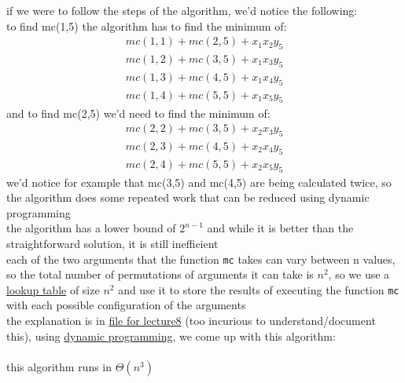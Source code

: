 \documentclass[a4paper,12pt]{article}
\begin{document}
if we were to follow the steps of the algorithm, we'd notice the following:\\[0pt]
to find mc(1,5) the algorithm has to find the minimum of:\\[0pt]
\begin{gather*}
  mc(1,1) + mc(2,5) + x_1x_2y_5\\
  mc(1,2) + mc(3,5) + x_1x_3y_5\\
  mc(1,3) + mc(4,5) + x_1x_4y_5\\
  mc(1,4) + mc(5,5) + x_1x_5y_5
\end{gather*}
and to find mc(2,5) we'd need to find the minimum of:\\[0pt]
\begin{gather*}
  mc(2,2) + mc(3,5) + x_2x_3y_5\\
  mc(2,3) + mc(4,5) + x_2x_4y_5\\
  mc(2,4) + mc(5,5) + x_2x_5y_5
\end{gather*}
we'd notice for example that mc(3,5) and mc(4,5) are being calculated twice, so the algorithm does some repeated work that can be reduced using dynamic programming\\[0pt]
the algorithm has a lower bound of \(2^{n-1}\) and while it is better than the straightforward solution, it is still inefficient\\[0pt]
each of the two arguments that the function \texttt{mc} takes can vary between n values, so the total number of permutations of arguments it can take is \(n^2\), so we use a \href{20230208201152-array_as_map.org}{lookup table} of size \(n^2\) and use it to store the results of executing the function \texttt{mc} with each possible configuration of the arguments\\[0pt]
the explanation is in \href{file:///Volumes/brainpartition/brain/notes/data/C6/4FF75D-6235-43D2-9CB5-601918A73D95/הרצאה 8 אלגוריתמים א חוברת.pdf}{file for lecture8} (too incurious to understand/document this), using \href{20230102173117-dynamic_programming.org}{dynamic programming}, we come up with this algorithm:\\[0pt]
\\[0pt]

this algorithm runs in \(\Theta(n^3)\)
\end{document}
